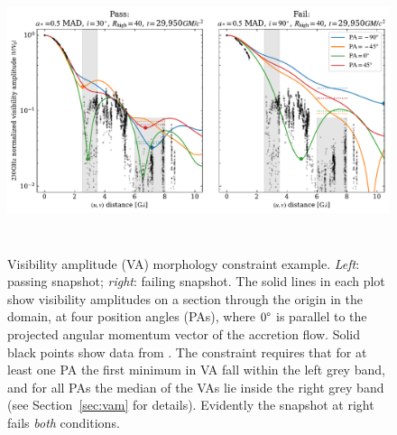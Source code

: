 \begin{figure}
  \centering
  \includegraphics[height=3.25in]{figures/passfail_va.pdf}
  \caption{Visibility amplitude (VA) morphology  constraint example.
    \emph{Left}: passing snapshot;
    \emph{right}: failing snapshot.
    The solid lines in each plot show visibility amplitudes on a section through the origin in the \uv domain, at four position angles (PAs), where $0\degree$ is parallel to the projected angular momentum vector of the accretion flow.
    Solid black points show data from \aprilvii.
    The \vam constraint requires that for at least one PA the first minimum in VA fall within the left grey band, and for all PAs the median of the VAs lie inside the right grey band (see Section~\ref{sec:vam} for details).
    Evidently the snapshot at right fails {\em both} conditions.}
  \label{fig:passfail_va}
\end{figure}

